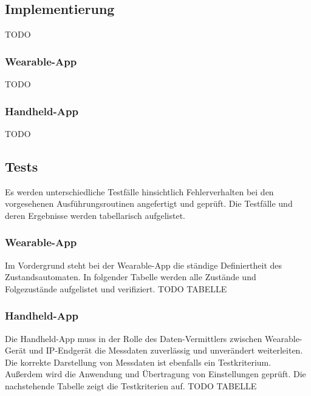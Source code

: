 \subsection{Implementierung}
TODO
\subsubsection{Wearable-App}
TODO
\subsubsection{Handheld-App}
TODO

\subsection{Tests}
Es werden unterschiedliche Testfälle hinsichtlich Fehlerverhalten bei den vorgesehenen Ausführungsroutinen angefertigt und geprüft. Die Testfälle und deren Ergebnisse werden tabellarisch aufgelistet.
\subsubsection{Wearable-App}
Im Vordergrund steht bei der Wearable-App die ständige Definiertheit des Zustandsautomaten. In folgender Tabelle werden alle Zustände und Folgezustände aufgelistet und verifiziert. 
TODO TABELLE
\subsubsection{Handheld-App}
Die Handheld-App muss in der Rolle des Daten-Vermittlers zwischen Wearable-Gerät und IP-Endgerät die Messdaten zuverlässig und unverändert weiterleiten. Die korrekte Darstellung von Messdaten ist ebenfalls ein Testkriterium. Außerdem wird die Anwendung und Übertragung von Einstellungen geprüft. Die nachstehende Tabelle zeigt die Testkriterien auf.
TODO TABELLE



